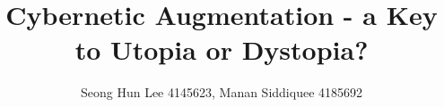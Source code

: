 
	\title{Cybernetic Augmentation - a Key to Utopia or Dystopia?}			  
	



\preauthor{\begin{center} \lineskip 0.1cm }
	\author{Seong Hun Lee 4145623, Manan Siddiquee 4185692}										%
	\postauthor{\end{center}} %

 \date{}																	%



